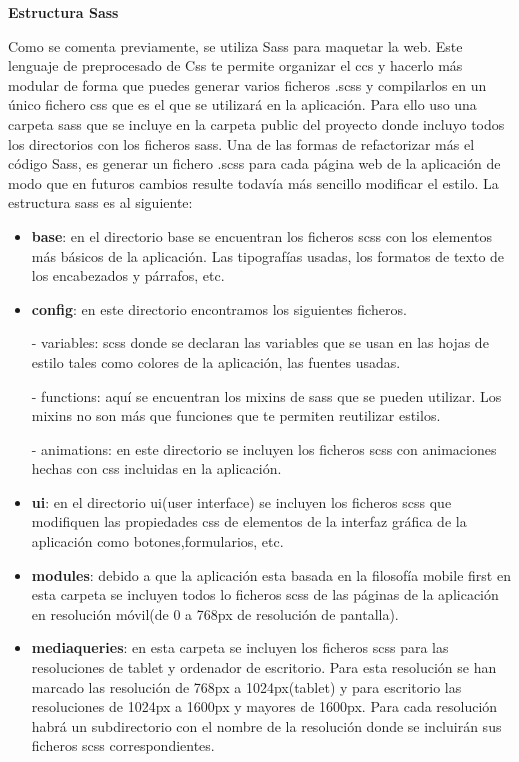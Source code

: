 \textbf{Estructura Sass} 

Como se comenta previamente, se utiliza Sass para maquetar la web. Este lenguaje de preprocesado de Css te permite organizar el ccs y hacerlo más modular de forma que puedes generar varios ficheros .scss y compilarlos en un único fichero css que es el que se utilizará en la aplicación. Para ello uso una carpeta sass que se incluye en la carpeta public del proyecto donde incluyo todos los directorios con los ficheros sass. Una de las formas de refactorizar más el código Sass, es generar un fichero .scss para cada página web de la aplicación de modo que en futuros cambios resulte todavía más sencillo modificar el estilo. La estructura sass es al siguiente:


\begin{itemize}

\item \textbf{base}: en el directorio base se encuentran los ficheros scss con los elementos más básicos de la aplicación. Las tipografías usadas, los formatos de texto de los encabezados y párrafos, etc.

\item \textbf{config}: en este directorio encontramos los siguientes ficheros.

- variables: scss donde se declaran las variables que se usan en las hojas de estilo tales como colores de la aplicación, las fuentes usadas.

- functions: aquí se encuentran los mixins de sass que se pueden utilizar. Los mixins no son más que funciones que te permiten reutilizar estilos.

- animations: en este directorio se incluyen los ficheros scss con animaciones hechas con css incluidas en la aplicación.

\item \textbf{ui}: en el directorio ui(user interface) se incluyen los ficheros scss que modifiquen las propiedades css de elementos de la interfaz gráfica de la aplicación como botones,formularios, etc.

\item \textbf{modules}: debido a que la aplicación esta basada en la filosofía mobile first en esta carpeta se incluyen todos lo ficheros scss de las páginas de la aplicación en resolución móvil(de 0 a 768px de resolución de pantalla).

\item \textbf{mediaqueries}: en esta carpeta se incluyen los ficheros scss para las resoluciones de tablet y ordenador de escritorio. Para esta resolución se han marcado las resolución de 768px a 1024px(tablet) y para escritorio las resoluciones de 1024px a 1600px y mayores de 1600px. Para cada resolución habrá un subdirectorio con el nombre de la resolución donde se incluirán sus ficheros scss correspondientes.


\end{itemize}

